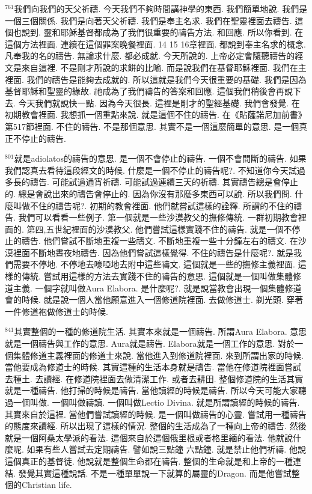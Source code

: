 \documentclass{book}
\begin{document}
$^{761}$我們向我們的天父祈禱.
今天我們不夠時間講神學的東西.
我們簡單地說.
我們是一個三個關係.
我們是向著天父祈禱.
我們是奉主名求.
我們在聖靈裡面去禱告.
這個也說到.
靈和耶穌基督都成為了我們很重要的禱告方法.
和回應.
所以你看到.
在這個方法裡面.
連續在這個罪案晚餐裡面.
14 15 16章裡面.
都說到奉主名求的概念.
凡奉我的名的禱告.
無論求什麼.
都必成就.
今天所說的.
上帝必定會隨聽禱告的經文是來自這裡.
不是剛才所說的求餅的比喻.
而是說我們在基督耶穌裡面.
我們在主裡面.
我們的禱告是能夠去成就的.
所以這就是我們今天很重要的基礎.
我們是因為基督耶穌和聖靈的緣故.
祂成為了我們禱告的答案和回應.
這個我們稍後會再說下去.
今天我們就說快一點.
因為今天很長.
這裡是剛才的聖經基礎.
我們會發覺.
在初期教會裡面.
我想抓一個重點來說.
就是這個不住的禱告.
在《貼薩諾尼加前書》第517節裡面.
不住的禱告.
不是那個意思.
其實不是一個這麼簡單的意思.
是一個真正不停止的禱告.

$^{801}$就是adiolatos的禱告的意思.
是一個不會停止的禱告.
一個不會間斷的禱告.
如果我們認真去看待這段經文的時候.
什麼是一個不停止的禱告呢?.
不知道你今天試過多長的禱告.
可能試過通宵祈禱.
可能試過連續三天的祈禱.
其實禱告總是會停止的.
總是會說出來的禱告會停止的.
因為你沒有那麼多東西可以說.
所以我們問.
什麼叫做不住的禱告呢?.
初期的教會裡面.
他們就嘗試這樣的詮釋.
所謂的不住的禱告.
我們可以看看一些例子.
第一個就是一些沙漠教父的撫修傳統.
一群初期教會裡面的.
第四,五世紀裡面的沙漠教父.
他們嘗試這樣實踐不住的禱告.
就是一個不停止的禱告.
他們嘗試不斷地重複一些禱文.
不斷地重複一些十分鐘左右的禱文.
在沙漠裡面不斷地晝夜地禱告.
因為他們嘗試這樣覺得.
不住的禱告是什麼呢?.
就是我們需要不停地.
不停地去嚎啞地去附中這些禱文.
這個就是一些的撫修主義裡面.
這樣的傳統.
嘗試用這樣的方法去實踐不住的禱告的意思.
這個就是一個叫做集體修道主義.
一個字就叫做Aura Elabora.
是什麼呢?.
就是說當教會出現一個集體修道會的時候.
就是說一個人當他願意進入一個修道院裡面.
去做修道士.
剃光頭.
穿著一件修道袍做修道士的時候.

$^{841}$其實整個的一種的修道院生活.
其實本來就是一個禱告.
所謂Aura Elabora.
意思就是一個禱告與工作的意思.
Aura就是禱告.
Elabora就是一個工作的意思.
對於一個集體修道主義裡面的修道士來說.
當他進入到修道院裡面.
來到所謂出家的時候.
當他要成為修道士的時候.
其實這種的生活本身就是禱告.
當他在修道院裡面嘗試去種土.
去讀經.
在修道院裡面去做清潔工作.
或者去耕田.
整個修道院的生活其實就是一種禱告.
他打掃的時候是禱告.
當他讀經的時候是禱告.
所以今天可能大家聽過一個叫做.
一個叫做禱讀.
一個叫做Lectio Divina.
就是所謂讀經的時候的禱告.
其實來自於這裡.
當他們嘗試讀經的時候.
是一個叫做禱告的心靈.
嘗試用一種禱告的態度來讀經.
所以出現了這樣的情況.
整個的生活成為了一種向上帝的禱告.
然後就是一個阿桑太學派的看法.
這個來自於這個俄里根或者格里緬的看法.
他就說什麼呢.
如果有些人嘗試去定期禱告.
譬如說三點鐘 六點鐘.
就是禁止他們祈禱.
他說這個真正的基督徒.
他說就是整個生命都在禱告.
整個的生命就是和上帝的一種連結.
發覺其實這種說話.
不是一種單單說一下就算的屬靈的Dragon.
而是他嘗試整個的Christian life.
\end{document}
